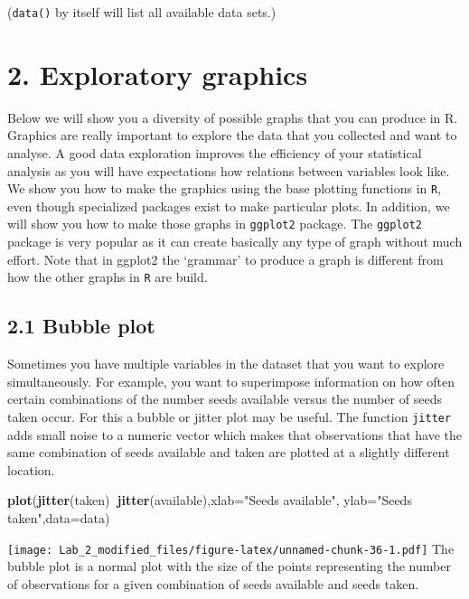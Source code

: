 \documentclass[11pt,]{article}
\newenvironment{Shaded}{\begin{snugshade}}{\end{snugshade}}
\newcommand{\KeywordTok}[1]{\textcolor[rgb]{0.13,0.29,0.53}{\textbf{#1}}}
\newcommand{\DataTypeTok}[1]{\textcolor[rgb]{0.13,0.29,0.53}{#1}}
\newcommand{\StringTok}[1]{\textcolor[rgb]{0.31,0.60,0.02}{#1}}
\newcommand{\OperatorTok}[1]{\textcolor[rgb]{0.81,0.36,0.00}{\textbf{#1}}}
\newcommand{\NormalTok}[1]{#1}
\begin{document}
(\texttt{data()} by itself will list all available data sets.)

\section{2. Exploratory graphics}\label{exploratory-graphics}

Below we will show you a diversity of possible graphs that you can
produce in R. Graphics are really important to explore the data that you
collected and want to analyse. A good data exploration improves the
efficiency of your statistical analysis as you will have expectations
how relations between variables look like. We show you how to make the
graphics using the base plotting functions in \texttt{R}, even though
specialized packages exist to make particular plots. In addition, we
will show you how to make those graphs in \texttt{ggplot2} package. The
\texttt{ggplot2} package is very popular as it can create basically any
type of graph without much effort. Note that in ggplot2 the `grammar' to
produce a graph is different from how the other graphs in \texttt{R} are
build.

\subsection{2.1 Bubble plot}\label{bubble-plot}

Sometimes you have multiple variables in the dataset that you want to
explore simultaneously. For example, you want to superimpose information
on how often certain combinations of the number seeds available versus
the number of seeds taken occur. For this a bubble or jitter plot may be
useful. The function \texttt{jitter} adds small noise to a numeric
vector which makes that observations that have the same combination of
seeds available and taken are plotted at a slightly different location.

\begin{Shaded}
\begin{Highlighting}[]
\KeywordTok{plot}\NormalTok{(}\KeywordTok{jitter}\NormalTok{(taken)}\OperatorTok{~}\KeywordTok{jitter}\NormalTok{(available),}\DataTypeTok{xlab=}\StringTok{"Seeds available"}\NormalTok{,}
     \DataTypeTok{ylab=}\StringTok{"Seeds taken"}\NormalTok{,}\DataTypeTok{data=}\NormalTok{data)}
\end{Highlighting}
\end{Shaded}

\texttt{[image: Lab\_2\_modified\_files/figure-latex/unnamed-chunk-36-1.pdf]}
The bubble plot is a normal plot with the size of the points
representing the number of observations for a given combination of seeds
available and seeds taken.
\end{document}
